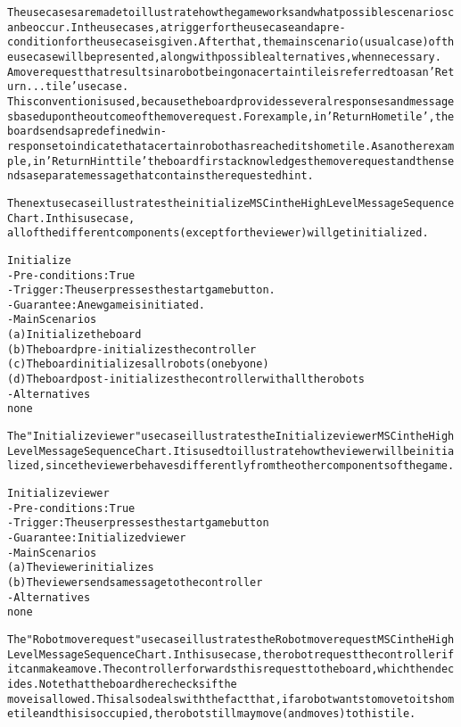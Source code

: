 \begin{alltt}
\rm
The use cases are made to illustrate how the game works and what possible scenarios can be occur. In the use cases, a trigger for the use case and a pre-condition for the use case is given. After that, the main scenario (usual case) of the use case will be presented, along with possible alternatives, when necessary. \\
A move request that results in a robot being on a certain tile is referred to as an 'Return ... tile' use case. 
This convention is used, because the board provides several responses and messages based upon the outcome of the move request. For example, in 'Return Home tile', the board sends a predefined win-response to indicate that a certain robot has reached its home tile. As another example, in 'Return Hint tile' the board first acknowledges the move request and then sends a separate message that contains the requested hint.

The next use case illustrates the initialize MSC in the High Level Message Sequence Chart. In this use case, 
all of the different components (except for the viewer) will get initialized.

Initialize
- Pre-conditions: True
- Trigger: The user presses the start game button.
- Guarantee: A new game is initiated.
- Main Scenarios
    (a) Initialize the board
    (b) The board pre-initializes the controller
    (c) The board initializes all robots (one by one)
    (d) The board post-initializes the controller with all the robots
- Alternatives
    none

The "Initialize viewer" use case illustrates the Initialize viewer MSC in the High Level Message Sequence Chart. It is used to illustrate how the viewer will be initialized, since the viewer behaves differently from the other components of the game.

Initialize viewer
- Pre-conditions: True
- Trigger: The user presses the start game button
- Guarantee: Initialized viewer
- Main Scenarios
    (a) The viewer initializes
    (b) The viewer sends a message to the controller
- Alternatives
    none

The "Robot move request" use case illustrates the Robot move request MSC in the High Level Message Sequence Chart. In this use case, the robot request the controller if it can make a move. The controller forwards this request to the board, which then decides. Note that the board here checks if the 
move is allowed. This also deals with the fact that, if a robot wants to move to its home tile and this is occupied, the robot still may move (and moves) to this tile.


\end{alltt}
